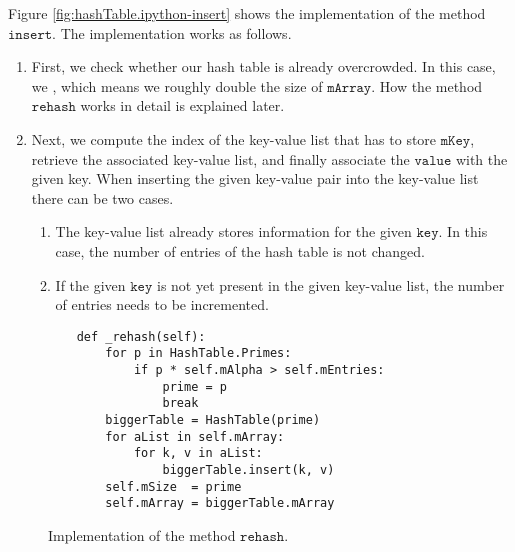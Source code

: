 Figure \ref{fig:hashTable.ipython-insert} shows the implementation of the method $\texttt{insert}$.
The implementation works as follows.
\begin{enumerate}
\item First, we check whether our hash table is already overcrowded.
      In this case, we , which means we roughly double the size of $\texttt{mArray}$.
      How the method $\texttt{rehash}$ works in detail is explained later.
\item Next, we compute the index of the key-value list that has to store
      $\texttt{mKey}$, retrieve the associated key-value list, and finally associate the
      $\texttt{value}$ with the given key.  When inserting the given key-value
      pair into the key-value list there can be two cases.
      \begin{enumerate}
      \item The key-value list already stores information for the given $\texttt{key}$.
            In this case, the number of entries of the hash table is not changed.
      \item If the given $\texttt{key}$ is not yet present in the given key-value list,
            the number of entries needs to be incremented.
      \end{enumerate}
\end{enumerate}


\begin{figure}[!ht]
\centering
\begin{verbatim}
    def _rehash(self):
        for p in HashTable.Primes:
            if p * self.mAlpha > self.mEntries:
                prime = p
                break
        biggerTable = HashTable(prime)
        for aList in self.mArray:
            for k, v in aList:
                biggerTable.insert(k, v)
        self.mSize  = prime
        self.mArray = biggerTable.mArray
\end{verbatim}
\vspace*{-0.3cm}
\caption{Implementation of the method $\texttt{rehash}$.}
\label{fig:hashTable.ipython-rehash}
\end{figure}


